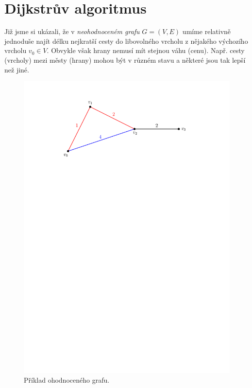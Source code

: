 \section{Dijkstrův algoritmus}\label{sec:dijkstra}

Již jsme si ukázali, že v \emph{neohodnoceném grafu} $G=(V,E)$ umíme relativně jednoduše najít délku nejkratší cesty do libovolného vrcholu z nějakého výchozího vrcholu $v_0\in V$. Obvykle však hrany nemusí mít stejnou váhu (cenu). Např. cesty (vrcholy) mezi městy (hrany) mohou být v různém stavu a některé jsou tak lepší než jiné.
\begin{figure}[h]
    \centering
    \includegraphics[scale=\graphimgsize]{components/images/ch01_ohod_graf.pdf}
    \caption{Příklad ohodnoceného grafu.}
    \label{fig:ohod_graf}
\end{figure}
